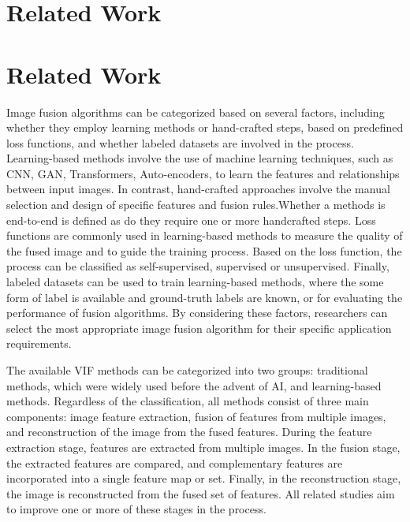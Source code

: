 \chapter{Related Work}
\label{chp:b2}

\chapter{Related Work}
\label{chp:02bgwork}

Image fusion algorithms can be categorized based on several factors, including whether they employ learning methods or hand-crafted steps, based on predefined loss functions, and whether labeled datasets are involved in the process. Learning-based methods involve the use of machine learning techniques, such as CNN, GAN, Transformers, Auto-encoders, to learn the features and relationships between input images. In contrast, hand-crafted approaches involve the manual selection and design of specific features and fusion rules.Whether a methods is end-to-end is defined as do they require one or more handcrafted steps. Loss functions are commonly used in learning-based methods to measure the quality of the fused image and to guide the training process. Based on the loss function, the process can be classified as self-supervised, supervised or unsupervised. Finally, labeled datasets can be used to train learning-based methods, where the some form of label is available and ground-truth labels are known, or for evaluating the performance of fusion algorithms. By considering these factors, researchers can select the most appropriate image fusion algorithm for their specific application requirements.

The available VIF methods can be categorized into two groups: traditional methods, which were widely used before the advent of AI, and learning-based methods. Regardless of the classification, all methods consist of three main components: image feature extraction, fusion of features from multiple images, and reconstruction of the image from the fused features. During the feature extraction stage, features are extracted from multiple images. In the fusion stage, the extracted features are compared, and complementary features are incorporated into a single feature map or set. Finally, in the reconstruction stage, the image is reconstructed from the fused set of features. All related studies aim to improve one or more of these stages in the process.


